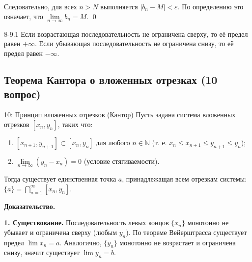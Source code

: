 \documentclass[a4paper,12pt]{article}
\newcommand{\myproof}{\textbf{Доказательство.}\ }
\begin{document}
	Следовательно, для всех $n > N$ выполняется $|b_n - M| < \varepsilon$. 
	По определению это означает, что $\lim\limits_{n \to \infty} b_n = M$. \qed
	
	\begin{center}
	\end{center}
	
	\vspace{0.5cm}
	\begin{remarkbox}{8-9.1}
		Если возрастающая последовательность не ограничена сверху, то её предел равен $+\infty$. Если убывающая последовательность не ограничена снизу, то её предел равен $-\infty$.
	\end{remarkbox}
	
	
	
	
	
	
	
	
	\subsection{Теорема Кантора о вложенных отрезках (10 вопрос)}
	
	\begin{theorembox}{10: Принцип вложенных отрезков (Кантор)}
		Пусть задана система вложенных отрезков $[x_n, y_n]$, таких что:
		\begin{enumerate}
			\item $[x_{n+1}, y_{n+1}] \subset [x_n, y_n]$ для любого $n \in \mathbb{N}$ (т. е. $x_n \le x_{n+1} \le y_{n+1} \le y_n$);
			\item $\lim\limits_{n \to \infty} (y_n - x_n) = 0$ (условие стягиваемости).
		\end{enumerate}
		Тогда существует единственная точка $a$, принадлежащая всем отрезкам системы: $\{a\} = \bigcap_{n=1}^{\infty} [x_n, y_n]$.
	\end{theorembox}
	
	\vspace{0.5cm}	
	\myproof
	
	\textbf{1. Существование.}
	Последовательность левых концов $\{x_n\}$ монотонно не убывает и ограничена сверху (любым $y_n$). По теореме Вейерштрасса существует предел $\lim x_n = a$. Аналогично, $\{y_n\}$ монотонно не возрастает и ограничена снизу, значит существует $\lim y_n = b$.
	
\end{document}
